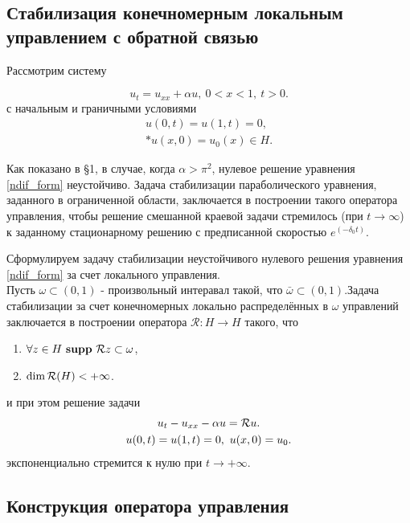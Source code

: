 \subsection{Стабилизация конечномерным локальным управлением с обратной связью}
\vspace{1em}

Рассмотрим систему

\begin{equation}\label{ndif_form}
    u_t = u_{xx} + \alpha u, \ 0 < x < 1, \ t > 0.
\end{equation}
с начальным и граничными условиями
\begin{gather}
    u(0, t) = u(1, t) = 0, \\*
    u(x, 0) = u_{0}(x) \in H .\nonumber
\end{gather}

Как показано в \S 1, в случае, когда $\alpha > \pi^2$, нулевое решение уравнения 
\eqref{ndif_form} неустойчиво.
Задача стабилизации параболического уравнения, заданного в ограниченной области,
заключается в построении такого оператора управления, чтобы решение смешанной 
краевой задачи стремилось (при $t \rightarrow \infty$) к заданному стационарному 
решению с предписанной скоростью $e^{(-\delta_0t)}$.

Сформулируем задачу стабилизации неустойчивого нулевого решения уравнения 
\eqref{ndif_form} за счет локального управления.\\

Пусть $\omega \subset (0, 1)$ - произвольный интеравал такой, что 
$\bar{\omega} \subset (0, 1)$.Задача стабилизации за счет конечномерных локально 
распределённых в $\omega$ управлений заключается в построении оператора 
$\mathcal{R} : H \rightarrow H$ такого, что

\begin{enumerate}
    \item $\forall z \in H \ \mathbf{supp} \ \operator{z} \subset \omega$,
    \item $\dim \mathcal{R}{(H)} < +\infty$.
\end{enumerate}
и при этом решение задачи
\begin{gather}
    u_t - u_{xx} - \alpha u = \mathcal{R}{u}. \nonumber\\
    u(0, t) = u(1, t) = 0, \ u(x, 0) = u_0. \nonumber
\end{gather}
экспоненциально стремится к нулю при $t \rightarrow + \infty$.

\subsection{Конструкция оператора управления}
\vspace{1em}

